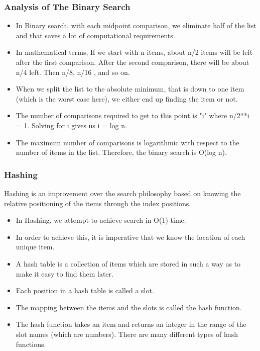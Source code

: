 \documentclass{beamer}
\begin{document}
\begin{frame}
\frametitle{Analysis of The Binary Search}
\begin{itemize}
\item In Binary search, with each midpoint comparison, we eliminate half of the list and that saves a lot of computational requirements.
\item In mathematical terms, If we start with n items, about n/2 items will be left after the first comparison. After the second comparison, there will be about n/4 left. Then n/8, n/16 , and so on.
\item When we split the list to the absolute minimum, that is down to one item (which is the worst case here), we either end up finding the item or not.
\item The number of comparisons required to get to this point is "i" where n/2**i = 1. Solving for i gives us i = log n.
\item The maximum number of comparisons is logarithmic with respect to the number of items in the list. Therefore, the binary search is O(log n).
\end{itemize}
\end{frame}

\begin{frame}
\frametitle{Hashing}
Hashing is an improvement over the search philosophy based on knowing the relative positioning of the items through the index positions.
\begin{itemize}
\item In Hashing, we attempt to achieve search in O(1) time.
\item In order to achieve this, it is imperative that we know the location of each unique item.
\item A hash table is a collection of items which are stored in such a way as to make it easy to find them later.
\item Each position in a hash table is called a slot.
\item The mapping between the items and the slots is called the hash function.
\item The hash function takes an item and returns an integer in the range of the slot names (which are numbers). There are many different types of hash functions.
\end{itemize}
\end{frame}
\end{document}
